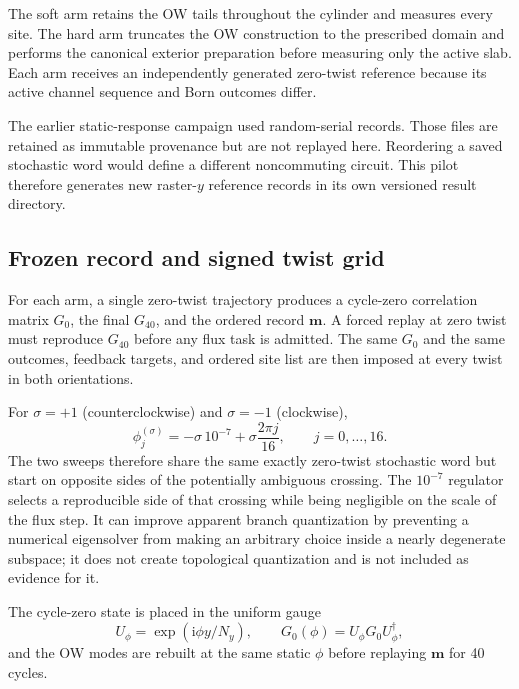 \documentclass[aps,prb,twocolumn,floatfix,nofootinbib,superscriptaddress]{revtex4-2}
\newcommand{\ii}{\mathrm{i}}
\begin{document}
The soft arm retains the OW tails throughout the cylinder and measures every
site.  The hard arm truncates the OW construction to the prescribed domain
and performs the canonical exterior preparation before measuring only the
active slab.  Each arm receives an independently generated zero-twist
reference because its active channel sequence and Born outcomes differ.

The earlier static-response campaign used random-serial records.  Those files
are retained as immutable provenance but are not replayed here.  Reordering a
saved stochastic word would define a different noncommuting circuit.  This
pilot therefore generates new raster-$y$ reference records in its own
versioned result directory.

\subsection{Frozen record and signed twist grid}

For each arm, a single zero-twist trajectory produces a cycle-zero correlation
matrix $G_0$, the final $G_{40}$, and the ordered record
$\boldsymbol m$.  A forced replay at zero twist must reproduce $G_{40}$ before
any flux task is admitted.  The same $G_0$ and the same outcomes, feedback
targets, and ordered site list are then imposed at every twist in both
orientations.

For $\sigma=+1$ (counterclockwise) and $\sigma=-1$ (clockwise),
\begin{equation}
 \phi_j^{(\sigma)}
 =-\sigma\,10^{-7}
 +\sigma\frac{2\pi j}{16},
 \qquad j=0,\ldots,16.
 \label{eq:twist-grid}
\end{equation}
The two sweeps therefore share the same exactly zero-twist stochastic word but
start on opposite sides of the potentially ambiguous crossing.  The
$10^{-7}$ regulator selects a reproducible side of that crossing while being
negligible on the scale of the flux step.  It can improve apparent branch
quantization by preventing a numerical eigensolver from making an arbitrary
choice inside a nearly degenerate subspace; it does not create topological
quantization and is not included as evidence for it.

The cycle-zero state is placed in the uniform gauge
\begin{equation}
 U_\phi=\exp\!\left(\ii\phi y/N_y\right),\qquad
 G_0(\phi)=U_\phi G_0 U_\phi^\dagger,
\end{equation}
and the OW modes are rebuilt at the same static $\phi$ before replaying
$\boldsymbol m$ for 40 cycles.
\end{document}
